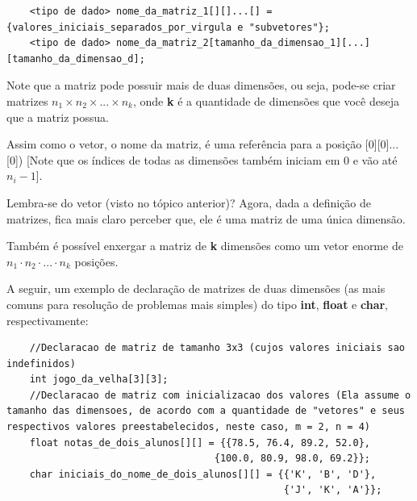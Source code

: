 \documentclass[12pt]{article}
\newcommand\tab[1][1cm]{\hspace*{#1}}
\begin{document}
\hspace{0.25cm}
\begin{lstlisting}
    <tipo de dado> nome_da_matriz_1[][]...[] = {valores_iniciais_separados_por_virgula e "subvetores"};
    <tipo de dado> nome_da_matriz_2[tamanho_da_dimensao_1][...][tamanho_da_dimensao_d];
\end{lstlisting}

\hspace{0.25cm}
\begin{tcolorbox}[colback=yellow!5!white,colframe=yellow!75!black,title=Atenção!]
  \par\tab Note que a matriz pode possuir mais de duas dimensões, ou seja, pode-se criar matrizes $n_1 \times n_2 \times ... \times n_k$, onde \textbf{k} é a quantidade de dimensões que você deseja que a matriz possua.
  \par\tab Assim como o vetor, o nome da matriz, é uma referência para a posição [0][0]...[0]) [Note que os índices de todas as dimensões também iniciam em 0 e vão até $n_i - 1$].
\end{tcolorbox}

\hspace{0.25cm}
\begin{tcolorbox}[colback=green!5!white,colframe=green!75!black,title=Curiosidade]
  \par\tab Lembra-se do vetor (visto no tópico anterior)? Agora, dada a definição de matrizes, fica mais claro perceber que, ele é uma matriz de uma única dimensão.
  \par\tab Também é possível enxergar a matriz de \textbf{k} dimensões como um vetor enorme de $n_1 \cdot n_2 \cdot ... \cdot n_k$ posições.
\end{tcolorbox}

\hspace{0.25cm}
\par\tab A seguir, um exemplo de declaração de matrizes de duas dimensões (as mais comuns para resolução de problemas mais simples) do tipo \textbf{int}, \textbf{float} e \textbf{char}, respectivamente:

\hspace{0.25cm}
\begin{lstlisting}
    //Declaracao de matriz de tamanho 3x3 (cujos valores iniciais sao indefinidos)
    int jogo_da_velha[3][3];
    //Declaracao de matriz com inicializacao dos valores (Ela assume o tamanho das dimensoes, de acordo com a quantidade de "vetores" e seus respectivos valores preestabelecidos, neste caso, m = 2, n = 4)
    float notas_de_dois_alunos[][] = {{78.5, 76.4, 89.2, 52.0},
                                    {100.0, 80.9, 98.0, 69.2}};
    char iniciais_do_nome_de_dois_alunos[][] = {{'K', 'B', 'D'},
                                                {'J', 'K', 'A'}};
\end{lstlisting}
\end{document}

